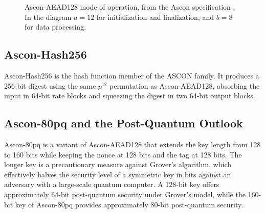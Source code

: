 \begin{figure}[htbp]
  \centering
  \caption[Ascon-AEAD128 mode of operation]{Ascon-AEAD128 mode of operation, from the Ascon
    specification \cite{ASCONSpec}. In the diagram $a = 12$ for initialization and finalization,
    and $b = 8$ for data processing.}
  \label{fig:scheme_ascon}
\end{figure}

\subsection{Ascon-Hash256}

Ascon-Hash256 is the hash function member of the ASCON family.
It produces a 256-bit digest using the same $p^{12}$ permutation as
Ascon-AEAD128, absorbing the input in 64-bit rate blocks and squeezing the
digest in two 64-bit output blocks.


\subsection{Ascon-80pq and the Post-Quantum Outlook}

Ascon-80pq is a variant of Ascon-AEAD128 that extends the key length from
128 to 160 bits while keeping the nonce at 128 bits and the tag at 128 bits.
The longer key is a precautionary measure against Grover's algorithm, which
effectively halves the security level of a symmetric key in bits against an
adversary with a large-scale quantum computer.
A 128-bit key offers approximately 64-bit post-quantum security under Grover's
model, while the 160-bit key of Ascon-80pq provides approximately 80-bit
post-quantum security.

